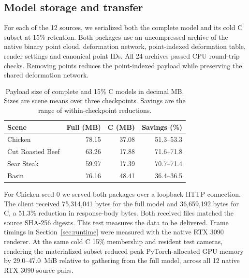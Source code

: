 \subsection{Model storage and transfer}\label{sec:delivery}
For each of the 12 sources, we serialized both the complete model and its cold C subset at 15\% retention. Both packages use an uncompressed archive of the native binary point cloud, deformation network, point-indexed deformation table, render settings and canonical point IDs. All 24 archives passed CPU round-trip checks. Removing points reduces the point-indexed payload while preserving the shared deformation network.
\begin{table}[htbp]
\centering\small
\caption{Payload size of complete and 15\% C models in decimal MB. Sizes are scene means over three checkpoints. Savings are the range of within-checkpoint reductions.}\label{tab:delivery}
\begin{tabular}{lrrr}\toprule
Scene & Full (MB) & C (MB) & Savings (\%) \\\midrule
Chicken & 78.15 & 37.08 & 51.3--53.3 \\
Cut Roasted Beef & 63.26 & 17.88 & 71.6--71.8 \\
Sear Steak & 59.97 & 17.39 & 70.7--71.4 \\
Basin & 76.16 & 48.41 & 36.4--36.5 \\\bottomrule
\end{tabular}
\end{table}
For Chicken seed 0 we served both packages over a loopback HTTP connection. The client received 75,314,041 bytes for the full model and 36,659,192 bytes for C, a 51.3\% reduction in response-body bytes. Both received files matched the source SHA-256 digests. This test measures the data to be delivered. Frame timings in Section~\ref{sec:runtime} were measured with the native RTX 3090 renderer.
At the same cold C 15\% membership and resident test cameras, rendering the materialized subset reduced peak PyTorch-allocated GPU memory by 29.0--47.0~MiB relative to gathering from the full model, across all 12 native RTX 3090 source pairs.
